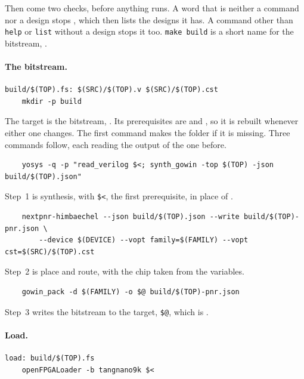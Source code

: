 \documentclass[11pt,a4paper]{article}
\begin{document}
Then come two checks, before anything runs. A word that is neither a command nor a design stops , which then lists the designs it has. A command other than \texttt{help} or \texttt{list} without a design stops it too. \texttt{make build} is a short name for the bitstream, .

\paragraph{The bitstream.}

\begin{verbatim}
build/$(TOP).fs: $(SRC)/$(TOP).v $(SRC)/$(TOP).cst
	mkdir -p build
\end{verbatim}

The target is the bitstream, . Its prerequisites are  and , so it is rebuilt whenever either one changes. The first command makes the  folder if it is missing. Three commands follow, each reading the output of the one before.

\begin{verbatim}
	yosys -q -p "read_verilog $<; synth_gowin -top $(TOP) -json build/$(TOP).json"
\end{verbatim}

Step~1 is synthesis, with \texttt{\$<}, the first prerequisite, in place of .

\begin{verbatim}
	nextpnr-himbaechel --json build/$(TOP).json --write build/$(TOP)-pnr.json \
	    --device $(DEVICE) --vopt family=$(FAMILY) --vopt cst=$(SRC)/$(TOP).cst
\end{verbatim}

Step~2 is place and route, with the chip taken from the variables.

\begin{verbatim}
	gowin_pack -d $(FAMILY) -o $@ build/$(TOP)-pnr.json
\end{verbatim}

Step~3 writes the bitstream to the target, \texttt{\$@}, which is .

\paragraph{Load.}

\begin{verbatim}
load: build/$(TOP).fs
	openFPGALoader -b tangnano9k $<
\end{verbatim}
\end{document}
